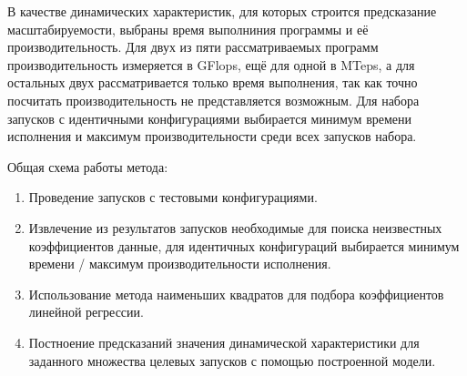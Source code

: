 	В качестве динамических характеристик, для которых строится предсказание масштабируемости, выбраны время выполниния программы и её производительность. Для двух из пяти рассматриваемых программ производительность измеряется в GFlops, ещё для одной в MTeps, а для остальных двух рассматривается только время выполнения, так как точно посчитать производительность не представляется возможным. Для набора запусков с идентичными конфигурациями выбирается минимум времени исполнения и максимум производительности среди всех запусков набора.


	Общая схема работы метода:
	\begin{enumerate}[I]
	\item Проведение запусков с тестовыми конфигурациями.
	\item Извлечение из результатов запусков необходимые для поиска неизвестных коэффициентов данные, для идентичных конфигураций выбирается минимум времени / максимум производительности исполнения.
	\item Использование метода наименьших квадратов для подбора коэффициентов линейной регрессии.
	\item Постноение предсказаний значения динамической характеристики для заданного множества целевых запусков с помощью построенной модели.
	\end{enumerate}
